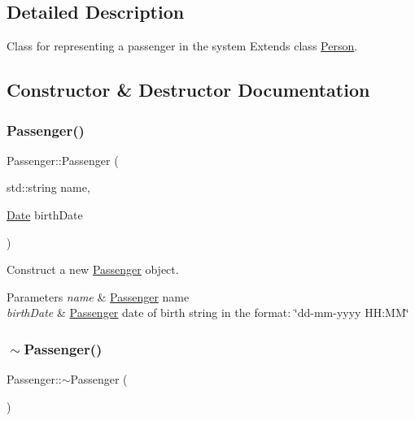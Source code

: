 \subsection{Detailed Description}
Class for representing a passenger in the system Extends class \mbox{\hyperlink{classPerson}{Person}}. 

\subsection{Constructor \& Destructor Documentation}
\mbox{\label{classPassenger_ac66212e8c1e35bb4423c6e1624ae31d9}} 
\subsubsection{\texorpdfstring{Passenger()}{Passenger()}}
{\footnotesize\ttfamily Passenger\+::\+Passenger (\begin{DoxyParamCaption}\item[{std\+::string}]{name,  }\item[{\mbox{\hyperlink{classDate}{Date}}}]{birth\+Date }\end{DoxyParamCaption})}



Construct a new \mbox{\hyperlink{classPassenger}{Passenger}} object. 


\begin{DoxyParams}{Parameters}
{\em name} & \mbox{\hyperlink{classPassenger}{Passenger}} name \\
\hline
{\em birth\+Date} & \mbox{\hyperlink{classPassenger}{Passenger}} date of birth string in the format\+: \char`\"{}dd-\/mm-\/yyyy H\+H\+:\+M\+M\char`\"{} \\
\hline
\end{DoxyParams}
\mbox{\label{classPassenger_a6a6747cafd45d2c85db2ec4e873be3c7}} 
\subsubsection{\texorpdfstring{$\sim$\+Passenger()}{~Passenger()}}
{\footnotesize\ttfamily Passenger\+::$\sim$\+Passenger (\begin{DoxyParamCaption}{ }\end{DoxyParamCaption})}



